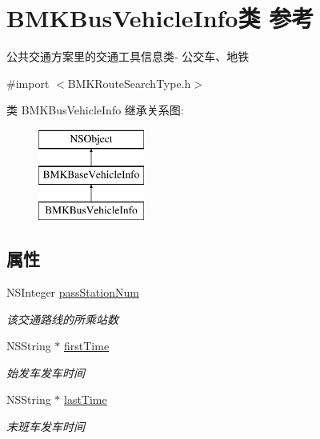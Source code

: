 \hypertarget{interface_b_m_k_bus_vehicle_info}{}\section{B\+M\+K\+Bus\+Vehicle\+Info类 参考}
\label{interface_b_m_k_bus_vehicle_info}


公共交通方案里的交通工具信息类-\/ 公交车、地铁  




{\ttfamily \#import $<$B\+M\+K\+Route\+Search\+Type.\+h$>$}

类 B\+M\+K\+Bus\+Vehicle\+Info 继承关系图\+:\begin{figure}[H]
\begin{center}
\leavevmode
\includegraphics[height=3.000000cm]{interface_b_m_k_bus_vehicle_info}
\end{center}
\end{figure}
\subsection*{属性}
\begin{DoxyCompactItemize}
\item 
\hypertarget{interface_b_m_k_bus_vehicle_info_a5998a43e75376ff6bc21634c1aaab0c8}{}N\+S\+Integer \hyperlink{interface_b_m_k_bus_vehicle_info_a5998a43e75376ff6bc21634c1aaab0c8}{pass\+Station\+Num}\label{interface_b_m_k_bus_vehicle_info_a5998a43e75376ff6bc21634c1aaab0c8}

\begin{DoxyCompactList}\small\item\em 该交通路线的所乘站数 \end{DoxyCompactList}\item 
\hypertarget{interface_b_m_k_bus_vehicle_info_a8eb3cadea05a4bf0b3fc5eb622de8de9}{}N\+S\+String $\ast$ \hyperlink{interface_b_m_k_bus_vehicle_info_a8eb3cadea05a4bf0b3fc5eb622de8de9}{first\+Time}\label{interface_b_m_k_bus_vehicle_info_a8eb3cadea05a4bf0b3fc5eb622de8de9}

\begin{DoxyCompactList}\small\item\em 始发车发车时间 \end{DoxyCompactList}\item 
\hypertarget{interface_b_m_k_bus_vehicle_info_a73d609a172b5f8ef3156c95b1e462da6}{}N\+S\+String $\ast$ \hyperlink{interface_b_m_k_bus_vehicle_info_a73d609a172b5f8ef3156c95b1e462da6}{last\+Time}\label{interface_b_m_k_bus_vehicle_info_a73d609a172b5f8ef3156c95b1e462da6}

\begin{DoxyCompactList}\small\item\em 末班车发车时间 \end{DoxyCompactList}\end{DoxyCompactItemize}


